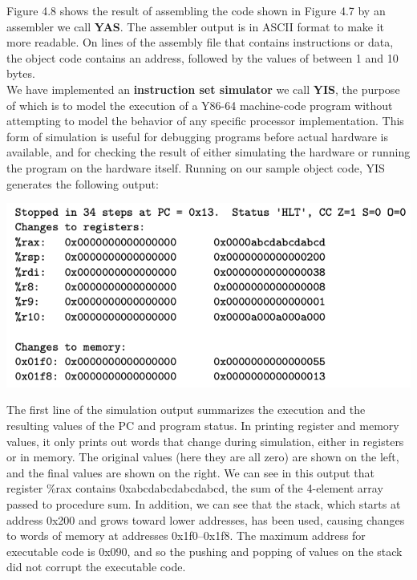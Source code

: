 \documentclass[11pt]{article}
\begin{document}
Figure 4.8 shows the result of assembling the code shown in Figure 4.7 by an assembler we call \textbf{YAS}. The assembler output is in ASCII format to make it more readable. On lines of the assembly file that contains instructions or data, the object code contains an address, followed by the values of between 1 and 10 bytes.\\

We have implemented an \textbf{instruction set simulator} we call \textbf{YIS}, the purpose of which is to model the execution of a Y86-64 machine-code program without attempting to model the behavior of any specific processor implementation. This form of simulation is useful for debugging programs before actual hardware is available, and for checking the result of either simulating the hardware or running the program on the hardware itself. Running on our sample object code, YIS generates the following output:\\

\begin{center}
\includegraphics[width=.9\linewidth]{pics/yis-output.png}
\end{center}

The first line of the simulation output summarizes the execution and the resulting values of the PC and program status. In printing register and memory values, it only prints out words that change during simulation, either in registers or in memory. The original values (here they are all zero) are shown on the left, and the final values are shown on the right. We can see in this output that register \%rax contains 0xabcdabcdabcdabcd, the sum of the 4-element array passed to procedure sum. In addition, we can see that the stack, which starts at address 0x200 and grows toward lower addresses, has been used, causing changes to words of memory at addresses 0x1f0–0x1f8. The maximum address for executable code is 0x090, and so the pushing and popping of values on the stack did not corrupt the executable code.\\
\end{document}
